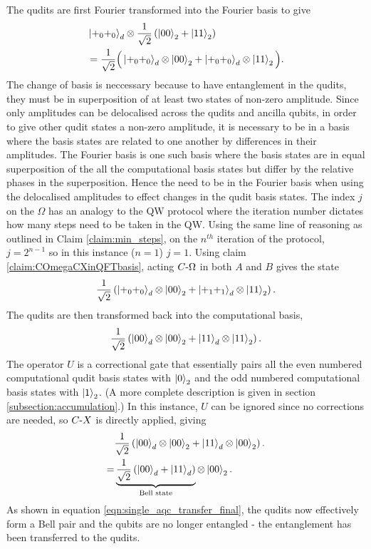 The qudits are first Fourier transformed into the Fourier basis to give
\begin{align}
    &\ket{+_0 +_0}_d\otimes\frac{1}{\sqrt{2}}\left(\ket{00}_2 + \ket{11}_2\right)\\
    &=\frac{1}{\sqrt{2}}\Big(
        \ket{+_0 +_0}_d \otimes \ket{00}_2
        +\ket{+_0 +_0}_d \otimes \ket{11}_2
        \Big).
\end{align}
The change of basis is neccessary because to have entanglement in the qudits, they must be in superposition of at least two states of non-zero amplitude.
Since only amplitudes can be delocalised across the qudits and ancilla qubits, in order to give other qudit states a non-zero amplitude, it is necessary to be in a basis where the basis states are related to one another by differences in their amplitudes.
The Fourier basis is one such basis where the basis states are in equal superposition of the all the computational basis states but differ by the relative phases in the superposition.
Hence the need to be in the Fourier basis when using the delocalised amplitudes to effect changes in the qudit basis states.
The index $j$ on the $\Omega$ has an analogy to the QW protocol where the iteration number dictates how many steps need to be taken in the QW.
Using the same line of reasoning as outlined in Claim \ref{claim:min_steps}, on the $n^{th}$ iteration of the protocol, $j = 2^{n-1}$ so in this instance ($n=1$) $j=1$.
Using claim \ref{claim:COmegaCXinQFTbasis}, acting $C\text{-}\Omega$ in both $A$ and $B$ gives the state
\begin{equation}
    \frac{1}{\sqrt{2}}\left(
        \ket{+_0 +_0}_d \otimes \ket{00}_2
        +\ket{+_1 +_1}_d \otimes \ket{11}_2
        \right).
\end{equation}
The qudits are then transformed back into the computational basis,
\begin{equation}
    \frac{1}{\sqrt{2}}\left(
        \ket{0 0}_d \otimes \ket{00}_2
        +\ket{1 1}_d \otimes \ket{11}_2
        \right).
\end{equation}
The operator $U$ is a correctional gate that essentially pairs all the even numbered computational qudit basis states with $\ket{0}_2$ and the odd numbered computational basis states with $\ket{1}_2$.
(A more complete description is given in section \ref{subsection:accumulation}.)
In this instance, $U$ can be ignored since no corrections are needed, so $C\text{-}X$ is directly applied, giving
\begin{align}
    &\frac{1}{\sqrt{2}}\left(
        \ket{00}_d \otimes \ket{00}_2
        +\ket{11}_d \otimes \ket{00}_2
        \right).\\
    =&\underbrace{
        \frac{1}{\sqrt{2}}\left(\ket{00}_d +\ket{11}_d\right)
    }_{\text{Bell state}}
    \otimes \ket{00}_2.    
    \label{eqn:single_aqc_transfer_final}
\end{align}
As shown in equation \ref{eqn:single_aqc_transfer_final}, the qudits now effectively form a Bell pair and the qubits are no longer entangled - the entanglement has been transferred to the qudits.

